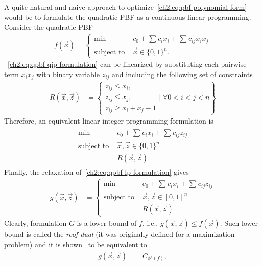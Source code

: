 A quite natural and naive approach to optimize~\cref{ch2:eq:pbf-polynomial-form} would be to formulate the quadratic PBF as a continuous linear programming. Consider the quadratic PBF
\begin{align}
	f(\vec{x}) = \left\{ \begin{array}{rl}
		\min &c_0 + \sum_{}{c_ix_i} + \sum_{}{c_{ij}x_ix_j} \\
	\text{subject to }& \vec{x} \in \{0,1\}^n.
	\end{array}\right.
	\label{ch2:eq:qpbf-qip-formulation}
\end{align}
%
~\cref{ch2:eq:qpbf-qip-formulation} can be linearized by substituting each pairwise term $x_ix_j$ with binary variable $z_{ij}$ and including the following set of constraints 
\begin{align*}
	R(\vec{x},\vec{z}) &= \left\{  \begin{array}{l}
	z_{ij} \leq x_i, \\
	z_{ij} \leq x_j, \\
	z_{ij} \geq x_i + x_j - 1 
	\end{array} \Bigg|\; \forall 0<i<j<n \right\}
\end{align*}
%
Therefore, an equivalent linear integer programming formulation is
\begin{align}
	\begin{array}{rl}
		\min& c_0 + \sum_{}{c_ix_i} + \sum_{}{c_{ij}z_{ij}} \\
		\text{subject to }&  \vec{x},\vec{z} \in \{0,1\}^n\\
		&R(\vec{x},\vec{z})	
	\end{array}
	\label{ch2:eq:qpbf-lp-formulation}
\end{align}
%
Finally, the relaxation of~\cref{ch2:eq:qpbf-lp-formulation} gives
\begin{align*}
	g(\vec{x},\vec{z}) &= \left\{ \begin{array}{rl}
		\min& c_0 + \sum_{}{c_ix_i} + \sum_{}{c_{ij}z_{ij}} \\
		\text{subject to }&  \vec{x},\vec{z} \in [0,1]^n\\
		&R(\vec{x},\vec{z})
	\end{array}\right.
\end{align*}
%
Clearly, formulation $G$ is a lower bound of $f$, i.e.,  $g(\vec{x},\vec{z}) \leq f(\vec{x})$. Such lower bound is called the \emph{roof dual} (it was originally defined for a maximization problem) and it is shown~\cite{hammer84} to be equivalent to
\begin{align*}
	g(\vec{x},\vec{z}) &= C_{\phi^{\star}(f)},
\end{align*}
